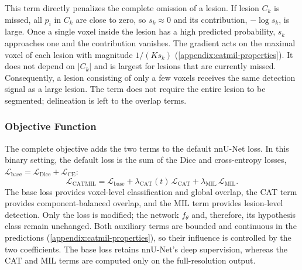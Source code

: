 This term directly penalizes the complete omission of a lesion. If lesion
$C_k$ is missed, all $p_i$ in $C_k$ are close to zero, so $s_k \approx 0$
and its contribution, $-\log s_k$, is large. Once a single voxel inside the
lesion has a high predicted probability, $s_k$ approaches one and the
contribution vanishes. The gradient acts on the maximal voxel of each
lesion with magnitude $1/(K s_k)$ (\cref{appendix:catmil-properties}).
It does not depend on $|C_k|$ and is largest for lesions that are currently
missed. Consequently, a lesion consisting of only a few voxels receives the
same detection signal as a large lesion. The term does not require the
entire lesion to be segmented; delineation is left to the overlap terms.

\subsubsection{Objective Function}

The complete objective adds the two terms to the default nnU-Net loss. In
this binary setting, the default loss is the sum of the Dice and
cross-entropy losses,
$\mathcal{L}_{\mathrm{base}} = \mathcal{L}_{\mathrm{Dice}} + \mathcal{L}_{\mathrm{CE}}$:
\begin{equation}
\mathcal{L}_{\mathrm{CATMIL}}
=
\mathcal{L}_{\mathrm{base}}
+
\lambda_{\mathrm{CAT}}(t)\, \mathcal{L}_{\mathrm{CAT}}
+
\lambda_{\mathrm{MIL}}\, \mathcal{L}_{\mathrm{MIL}} .
\label{eq:sl_catmil_loss}
\end{equation}
The base loss provides voxel-level classification and global overlap, the
CAT term provides component-balanced overlap, and the MIL term provides
lesion-level detection. Only the loss is modified; the network $f_{\theta}$
and, therefore, its hypothesis class remain unchanged. Both auxiliary terms
are bounded and continuous in the predictions
(\cref{appendix:catmil-properties}), so their influence is controlled by
the two coefficients. The base loss retains nnU-Net's deep supervision,
whereas the CAT and MIL terms are computed only on the full-resolution
output.

